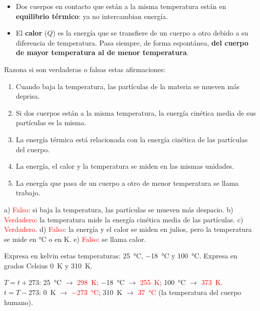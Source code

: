 \begin{definition}
    \begin{itemize}
        \item Dos cuerpos en contacto que están a la misma temperatura están en \textbf{equilibrio térmico}: ya no intercambian energía.
        \item El \textbf{calor} (\(Q\)) es la energía que se transfiere de un cuerpo a otro debido a su diferencia de temperatura. Pasa siempre, de forma espontánea, \textbf{del cuerpo de mayor temperatura al de menor temperatura}.
    \end{itemize}
\end{definition}

\begin{exercise}
    Razona si son verdaderas o falsas estas afirmaciones:
    \begin{enumerate}[label=\alph*)]
        \item Cuando baja la temperatura, las partículas de la materia se mueven más deprisa.
        \item Si dos cuerpos están a la misma temperatura, la energía cinética media de sus partículas es la misma.
        \item La energía térmica está relacionada con la energía cinética de las partículas del cuerpo.
        \item La energía, el calor y la temperatura se miden en las mismas unidades.
        \item La energía que pasa de un cuerpo a otro de menor temperatura se llama trabajo.
    \end{enumerate}
    \begin{solu}
        a) \textcolor{red}{Falso}: si baja la temperatura, las partículas se mueven más despacio. b) \textcolor{red}{Verdadero}: la temperatura mide la energía cinética media de las partículas. c) \textcolor{red}{Verdadero}. d) \textcolor{red}{Falso}: la energía y el calor se miden en julios, pero la temperatura se mide en \unit{\degreeCelsius} o en \unit{\kelvin}. e) \textcolor{red}{Falso}: se llama calor.
    \end{solu}
\end{exercise}

\begin{exercise}
    Expresa en kelvin estas temperaturas: \qty{25}{\degreeCelsius}, \qty{-18}{\degreeCelsius} y \qty{100}{\degreeCelsius}. Expresa en grados Celsius \qty{0}{\kelvin} y \qty{310}{\kelvin}.
    \begin{solu}
        \(T = t + 273\): \qty{25}{\degreeCelsius} \(\rightarrow\) \textcolor{red}{\qty{298}{\kelvin}}; \qty{-18}{\degreeCelsius} \(\rightarrow\) \textcolor{red}{\qty{255}{\kelvin}}; \qty{100}{\degreeCelsius} \(\rightarrow\) \textcolor{red}{\qty{373}{\kelvin}}. \(t = T - 273\): \qty{0}{\kelvin} \(\rightarrow\) \textcolor{red}{\qty{-273}{\degreeCelsius}}; \qty{310}{\kelvin} \(\rightarrow\) \textcolor{red}{\qty{37}{\degreeCelsius}} (la temperatura del cuerpo humano).
    \end{solu}
\end{exercise}

